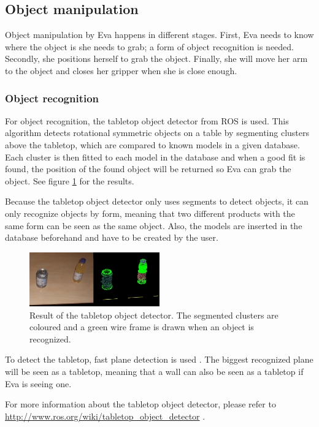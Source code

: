 \documentclass[project_eva.tex]{subfiles}
\begin{document}
\subsection*{Object manipulation}
Object manipulation by Eva happens in different stages. First, Eva needs to know where the object is she needs to grab; a 
form of object recognition is needed. Secondly, she  positions herself to grab the object. Finally, she will move her 
arm to the object and closes her gripper when she is close enough.

\subsubsection*{Object recognition}
For object recognition, the tabletop object detector from ROS is used. This algorithm detects rotational symmetric 
objects on a table by segmenting clusters above the tabletop, which are compared to known models in a given database. 
Each cluster is then fitted to each model in the database and when a good fit is found, the position of the found object 
will be returned so Eva can grab the object. See figure \ref{fig:tabletop} for the results.

Because the tabletop object detector only uses segments to detect objects, it can only recognize objects by form, meaning 
that two different products with the same form can be seen as the same object. Also, the models are inserted in the 
database beforehand and have to be created by the user.

\begin{figure}[h]
	\centering
	\mbox{\includegraphics[width=0.5\textwidth]{Images/object_detector.png}}
	\caption{Result of the tabletop object detector. The segmented clusters are coloured and a green wire frame is drawn 
	when an object is recognized.}
	\label{fig:tabletop}
\end{figure}

To detect the tabletop, fast plane detection is used \cite{plane}. The biggest recognized plane will be seen as a 
tabletop, meaning that a wall can also be seen as a 
tabletop if Eva is seeing one.

For more information about the tabletop object detector, please refer to 
\url{http://www.ros.org/wiki/tabletop\_object\_detector} \cite{tabletop}.
\end{document}
